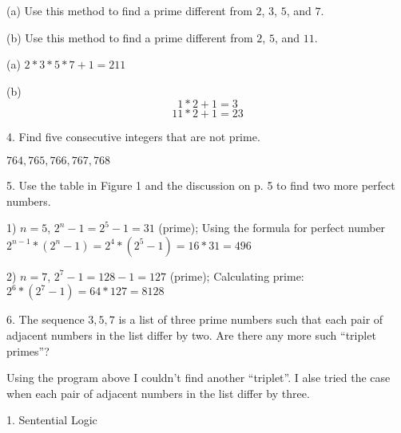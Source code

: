 \documentclass{article}
\begin{document}
(a) Use this method to find a prime different from $2$, $3$, $5$, and $7$.

(b) Use this method to find a prime different from $2$, $5$, and $11$.
\vspace{20pt}

(a) $2*3*5*7+1 = 211$
\vspace{10pt}

(b) $$1*2+1=3$$
    $$11*2+1=23$$
\vspace{40pt}

4. Find five consecutive integers that are not prime.
\vspace{20pt}

$764, 765, 766, 767, 768$
\vspace{40pt}

5. Use the table in Figure 1 and the discussion on p. 5 to find two more perfect
numbers.
\vspace{20pt}

1) $n = 5$, $2^n-1 = 2^5-1=31$ (prime); Using the formula for perfect number $2^{n-1}*(2^n-1) = 2^4*(2^5-1) = 16*31 = 496$
\vspace{10pt}

2) $n = 7$, $2^7-1= 128 - 1 = 127$ (prime); Calculating prime: $2^6*(2^7-1) = 64*127 = 8128$
\vspace{40pt}

6. The sequence $3, 5, 7$ is a list of three prime numbers such that each pair of
adjacent numbers in the list differ by two. Are there any more such “triplet
primes”?
\vspace{20pt}



Using the program above I couldn't find another “triplet”. I alse tried the case when each pair of adjacent numbers in the list differ by three.
\pagebreak

\centerline{\sc \large 1. Sentential Logic}
\vspace{50pt}
\end{document}
